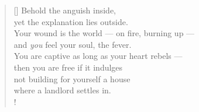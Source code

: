 \documentclass[a4paper,12pt,twoside,final]{book}
\begin{document}
\newpage


\settowidth{\versewidth}{Your wound is the world --- on fire, burning up ---}

\begin{verse}[\versewidth]
  Behold the anguish inside, \\
  yet the explanation lies outside. \\
  Your wound is the world --- on fire, burning up --- \\
  and \emph{you} feel your soul, the fever. \\
  You are captive as long as your heart rebels --- \\
  then you are free if it indulges \\
  not building for yourself a house \\
  where a landlord settles in. \\!
\end{verse}


\newpage

\settowidth{\versewidth}{nem raksz magadnak olyan házat,}
\end{document}
